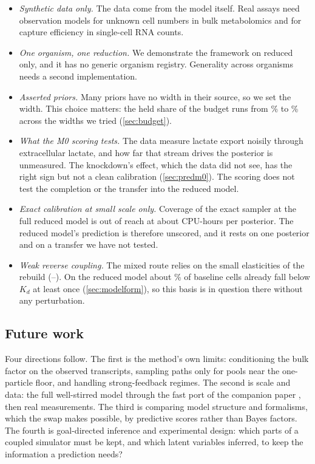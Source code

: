 \begin{itemize}
  \item \emph{Synthetic data only.} The data come from the model itself. Real
  assays need observation models for unknown cell numbers in bulk metabolomics and
  for capture efficiency in single-cell RNA counts.
  \item \emph{One organism, one reduction.} We demonstrate the framework on reduced
  \syn{} only, and it has no generic organism registry. Generality across organisms needs
  a second implementation.
  \item \emph{Asserted priors.} Many priors have no width in their source, so we set
  the width. This choice matters: the held share of the budget runs from
  \% to \% across the widths we tried
  (\cref{sec:budget}).
  \item \emph{What the M0 scoring tests.} The data measure lactate export noisily through
  extracellular lactate, and how far that stream drives the posterior is unmeasured. The
  knockdown's effect, which the data did not see, has the right sign but not a clean
  calibration (\cref{sec:predm0}). The scoring does not test the completion or the transfer
  into the reduced model.
  \item \emph{Exact calibration at small scale only.} Coverage of the exact sampler
  at the full reduced model is out of reach at about  CPU-hours per
  posterior. The reduced model's prediction is therefore unscored, and it rests on one
  posterior and on a transfer we have not tested.
  \item \emph{Weak reverse coupling.} The mixed route relies on the small
  elasticities of the rebuild (--). On the reduced model about \% of baseline cells already fall below $K_d$ at least once (\cref{sec:modelform}), so this basis is in question there without any perturbation.
\end{itemize}

\subsection{Future work}

Four directions follow. The first is the method's own limits: conditioning the bulk factor on the observed transcripts, sampling paths only for pools near the one-particle floor, and handling strong-feedback regimes. The second is scale and data: the full well-stirred
\syn{} model through the fast port of the companion paper \cite{kimpson2026whole}, then
real measurements. The third is comparing model structure and formalisms, which the swap
makes possible, by predictive scores rather than Bayes factors. The fourth is goal-directed
inference and experimental design: which parts of a coupled simulator must be kept, and
which latent variables inferred, to keep the information a prediction needs?
